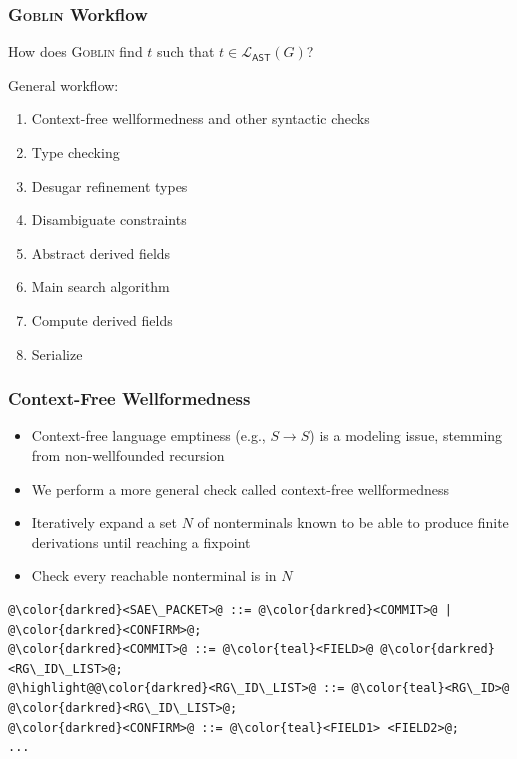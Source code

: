 \documentclass[11pt,xcolor={dvipsnames},hyperref={pdftex,pdfpagemode=UseNone,hidelinks,pdfdisplaydoctitle=true},usepdftitle=false]{beamer}
\newcommand{\system}{\textsc{Goblin}}
\newcommand{\green}[1]{\textcolor{green!60!black}{#1}}
\newcommand{\blue}[1]{\textcolor{blue!70!black}{#1}}
\begin{document}
\begin{frame} 
    \frametitle{\system{} Workflow}
    How does \system{} find \blue{$t$} such that \blue{$t \in \mathcal{L}_{\textsf{AST}}(G)$}?\\[4pt]\pause

    General workflow:\pause
    \begin{enumerate}
        \item \green{Context-free wellformedness} and other syntactic checks\pause
        \item Type checking\pause
        \item Desugar refinement types\pause
        \item Disambiguate constraints \pause
        \item \green{Abstract derived fields}\pause
        \item \green{Main search algorithm}\pause
        \item Compute derived fields\pause
        \item Serialize
    \end{enumerate}
\end{frame}

\begin{frame}[fragile]
    \frametitle{Context-Free Wellformedness}
    \begin{itemize}
        \item \green{Context-free language emptiness} (e.g., \blue{$S \rightarrow S$}) is a modeling issue, stemming from 
        \green{non-wellfounded recursion} \pause
        \item We perform a more general check called \green{context-free wellformedness}\pause
        \item[1.]  Iteratively expand a set \blue{$N$} of nonterminals known to be able to produce finite derivations 
        until reaching a fixpoint\pause
        \item[2.] Check every reachable nonterminal is in \blue{$N$}\pause
    \end{itemize}
\begin{lstlisting}[style=goblin]
@\color{darkred}<SAE\_PACKET>@ ::= @\color{darkred}<COMMIT>@ | @\color{darkred}<CONFIRM>@;
@\color{darkred}<COMMIT>@ ::= @\color{teal}<FIELD>@ @\color{darkred}<RG\_ID\_LIST>@;
@\highlight@@\color{darkred}<RG\_ID\_LIST>@ ::= @\color{teal}<RG\_ID>@ @\color{darkred}<RG\_ID\_LIST>@;
@\color{darkred}<CONFIRM>@ ::= @\color{teal}<FIELD1> <FIELD2>@;
...
\end{lstlisting}
\end{frame}
\end{document}
